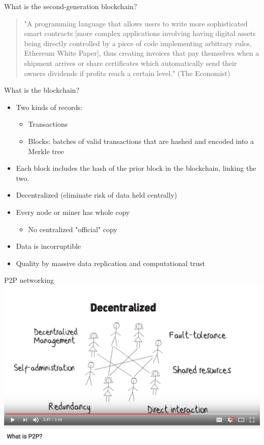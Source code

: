 \documentclass[presentation]{beamer}
\begin{document}
\begin{frame}[label=sec-2-2]{What is the second-generation blockchain?}
\begin{quotation}
"A programming language that allows users to write more sophisticated smart
contracts [more complex applications involving having digital assets being
directly controlled by a piece of code implementing arbitrary rules, Ethereum
White Paper], thus creating invoices that pay themselves when a shipment arrives
or share certificates which automatically send their owners dividends if profits
reach a certain level." (The Economist)
\end{quotation}
\end{frame}

\begin{frame}[label=sec-2-3]{What is the blockchain?}
\begin{itemize}
\item Two kinds of \alert{records}:
\begin{itemize}
\item Transactions
\item Blocks: batches of \alert{valid transactions} that are hashed and encoded into a \alert{Merkle tree}
\end{itemize}
\item Each block includes the \alert{hash} of the \alert{prior} block in the blockchain, linking the two.
\item \alert{Decentralized} (eliminate risk of data held centrally)
\item Every \alert{node} or \alert{miner} has whole copy
\begin{itemize}
\item No \alert{centralized} "official" copy
\end{itemize}
\item Data is \alert{incorruptible}
\item \alert{Quality} by massive data \alert{replication} and \alert{computational trust}
\end{itemize}
\end{frame}
\begin{frame}[label=sec-2-4]{P2P networking}
\includegraphics[width=.9\linewidth]{../images/p2p.png}
\end{frame}
\end{document}
